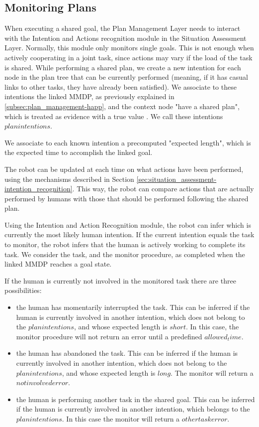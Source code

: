 \subsection{Monitoring Plans}
When executing a shared goal, the Plan Management Layer needs to interact with the Intention and Actions recognition module in the Situation Assessment Layer. Normally, this module only monitors single goals. This is not enough when actively cooperating in a joint task, since actions may vary if the load of the task is shared. While performing a shared plan, we create a new intention for each node in the plan tree that can be currently performed (meaning, if it has casual links to other tasks, they have already been satisfied). We associate to these intentions the linked MMDP, as previously explained in \ref{subsec:plan_management-happ},
 and the context node "have a shared plan", which is treated as evidence with a true value . We call these intentions $plan intentions$.

We associate to each known intention a precomputed "expected length", which is the expected time to accomplish the linked goal.

The robot can be updated at each time on what actions have been performed, using the mechanisms described in Section \ref{sec:situation_assessment-intention_recognition}. This way, the robot can compare actions that are actually performed by humans with those that should be performed following the shared plan.

Using the Intention and Action Recognition module, the robot can infer which is currently the most likely human intention. If the current intention equals the task to monitor, the robot infers that the human is actively working to complete its task. We consider the task, and the monitor procedure, as completed when the linked MMDP reaches a goal state.

If the human is currently not involved in the monitored task there are three possibilities:
\begin{itemize}
	\item the human has momentarily interrupted the task. This can be inferred if the human is currently involved in another intention, which does not belong to the $plan intentions$, and whose expected length is $short$. In this case, the monitor procedure will not return an error until a predefined $allowed_time$.
	\item the human has abandoned the task.  This can be inferred if the human is currently involved in another intention, which does not belong to the $plan intentions$, and whose expected length is $long$. The monitor will return a $not involved error$. 
	\item the human is performing another task in the shared goal. This can be inferred if the human is currently involved in another intention, which belongs to the $plan intentions$. In this case the monitor will return a $other task error$. 
\end{itemize}


